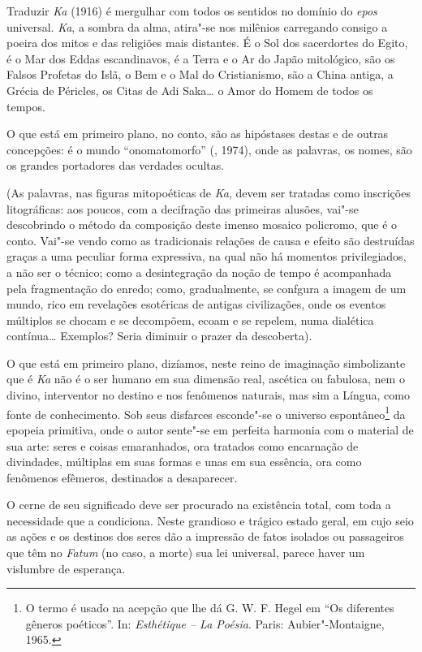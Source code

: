 {{{Traduzir \emph{Ka} (1916) é mergulhar com todos os sentidos no domínio
do \emph{epos} universal. \emph{Ka}, a sombra da alma, atira"-se nos
milênios carregando consigo a poeira dos mitos e das religiões mais
distantes. É o Sol dos sacerdortes do Egito, é o Mar dos Eddas
escandinavos, é a Terra e o Ar do Japão mitológico, são os Falsos
Profetas do Islã, o Bem e o Mal do Cristianismo, são a China antiga, a
Grécia de Péricles, os Citas de Adi Saka\ldots{} o Amor do Homem de todos os
tempos.

O que está em primeiro plano, no conto, são as hipóstases destas e de
outras concepções: é o mundo ``onomatomorfo'' (, 1974), onde as
palavras, os nomes, são os grandes portadores das verdades ocultas.

(As palavras, nas figuras mitopoéticas de \emph{Ka}, devem ser tratadas
como inscrições litográficas: aos poucos, com a decifração das primeiras
alusões, vai"-se descobrindo o método da composição deste imenso mosaico
policromo, que é o conto. Vai"-se vendo como as tradicionais relações de
causa e efeito são destruídas graças a uma peculiar forma expressiva, na
qual não há momentos privilegiados, a não ser o técnico; como a
desintegração da noção de tempo é acompanhada pela fragmentação do
enredo; como, gradualmente, se confgura a imagem de um mundo, rico em
revelações esotéricas de antigas civilizações, onde os eventos múltiplos
se chocam e se decompõem, ecoam e se repelem, numa dialética contínua\ldots{}
Exemplos? Seria diminuir o prazer da descoberta).

O que está em primeiro plano, dizíamos, neste reino de imaginação
simbolizante que é \emph{Ka} não é o ser humano em sua dimensão real,
ascética ou fabulosa, nem o divino, interventor no destino e nos
fenômenos naturais, mas sim a Língua, como fonte de conhecimento. Sob
seus disfarces esconde"-se o universo espontâneo\footnote{O termo é usado
  na acepção que lhe dá G. W. F. Hegel em ``Os diferentes gêneros
  poéticos''. In: \emph{Esthétique -- La Poésia}. Paris: Aubier"-Montaigne,
  1965.} da epopeia primitiva, onde o autor sente"-se em perfeita
harmonia com o material de sua arte: seres e coisas emaranhados, ora
tratados como encarnação de divindades, múltiplas em suas formas e unas
em sua essência, ora como fenômenos efêmeros, destinados a desaparecer.

O cerne de seu significado deve ser procurado na existência total, com
toda a necessidade que a condiciona. Neste grandioso e trágico estado
geral, em cujo seio as ações e os destinos dos seres dão a impressão de
fatos isolados ou passageiros que têm no \emph{Fatum} (no caso, a morte)
sua lei universal, parece haver um vislumbre de esperança.

}}}
